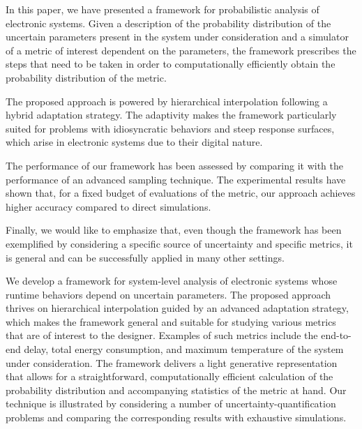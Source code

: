 In this paper, we have presented a framework for probabilistic analysis of
electronic systems. Given a description of the probability distribution of the
uncertain parameters present in the system under consideration and a simulator
of a metric of interest dependent on the parameters, the framework prescribes
the steps that need to be taken in order to computationally efficiently obtain
the probability distribution of the metric.

The proposed approach is powered by hierarchical interpolation following a
hybrid adaptation strategy. The adaptivity makes the framework particularly
suited for problems with idiosyncratic behaviors and steep response surfaces,
which arise in electronic systems due to their digital nature.

The performance of our framework has been assessed by comparing it with the
performance of an advanced sampling technique. The experimental results have
shown that, for a fixed budget of evaluations of the metric, our approach
achieves higher accuracy compared to direct simulations.

Finally, we would like to emphasize that, even though the framework has been
exemplified by considering a specific source of uncertainty and specific
metrics, it is general and can be successfully applied in many other settings.

We develop a framework for system-level analysis of electronic systems whose
runtime behaviors depend on uncertain parameters. The proposed approach thrives
on hierarchical interpolation guided by an advanced adaptation strategy, which
makes the framework general and suitable for studying various metrics that are
of interest to the designer. Examples of such metrics include the end-to-end
delay, total energy consumption, and maximum temperature of the system under
consideration. The framework delivers a light generative representation that
allows for a straightforward, computationally efficient calculation of the
probability distribution and accompanying statistics of the metric at hand. Our
technique is illustrated by considering a number of uncertainty-quantification
problems and comparing the corresponding results with exhaustive simulations.
